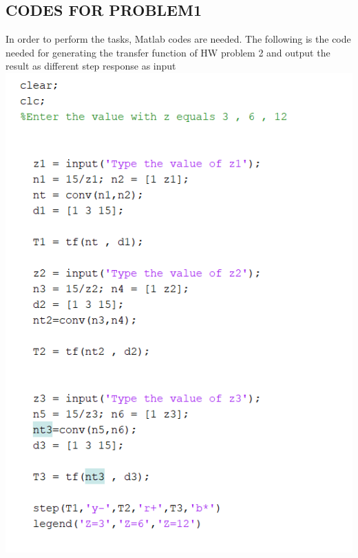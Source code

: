 \documentclass[12pt]{article}
\begin{document}
\subsection{CODES FOR PROBLEM1}
In order to perform the tasks, Matlab codes are needed. The following is the code needed for generating the transfer function of HW problem 2 and output the result as different step response as input\\
\includegraphics[scale=0.9]{../Lab6/HW_code2.png} \\

\cleardoublepage
\end{document}
